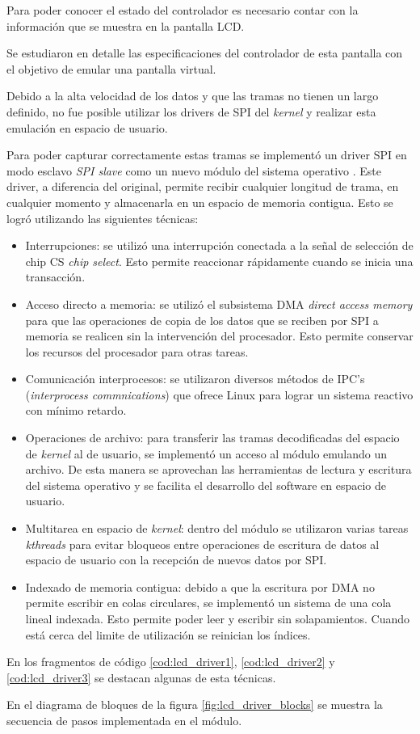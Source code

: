       Para poder conocer el estado del controlador es necesario contar con la información que se muestra en la pantalla LCD.\par
      Se estudiaron en detalle las especificaciones del controlador de esta pantalla con el objetivo de emular una pantalla virtual.\par
      Debido a la alta velocidad de los datos y que las tramas no tienen un largo definido, no fue posible utilizar los drivers de SPI del \textit{kernel} y realizar esta emulación en espacio de usuario.\par
      Para poder capturar correctamente estas tramas se implementó un driver SPI en modo esclavo \textit{SPI slave} como un nuevo módulo del sistema operativo \citep{ldd3}.
      Este driver, a diferencia del original, permite recibir cualquier longitud de trama, en cualquier momento y almacenarla en un espacio de memoria contigua.
      Esto se logró utilizando las siguientes técnicas:
      \begin{itemize}
         \item {Interrupciones: se utilizó una interrupción conectada a la señal de selección de chip CS \textit{chip select}. Esto permite reaccionar rápidamente cuando se inicia una transacción.}
         \item {Acceso directo a memoria: se utilizó el subsistema DMA \textit{direct access memory} para que las operaciones de copia de los datos que se reciben por SPI a memoria se realicen sin la intervención del procesador. Esto permite conservar los recursos del procesador para otras tareas.}
         \item{Comunicación interprocesos: se utilizaron diversos métodos de IPC's\citep{WEBSITE:kerneldocs} (\textit{interprocess commnications}) que ofrece Linux para lograr un sistema reactivo con mínimo retardo.}
         \item{Operaciones de archivo: para transferir las tramas decodificadas del espacio de \textit{kernel} al de usuario, se implementó un acceso al módulo emulando un archivo. De esta manera se aprovechan las herramientas de lectura y escritura del sistema operativo y se facilita el desarrollo del software en espacio de usuario.}
         \item{Multitarea en espacio de \textit{kernel}: dentro del módulo se utilizaron varias tareas \textit{kthreads} para evitar bloqueos entre operaciones de escritura de datos al espacio de usuario con la recepción de nuevos datos por SPI.}
         \item{Indexado de memoria contigua: debido a que la escritura por DMA no permite escribir en colas circulares, se implementó un sistema de una cola lineal indexada. Esto permite poder leer y escribir sin solapamientos. Cuando está cerca del limite de utilización se reinician los índices.}
      \end{itemize}
      En los fragmentos de código \ref{cod:lcd_driver1}, \ref{cod:lcd_driver2} y \ref{cod:lcd_driver3} se destacan algunas de esta técnicas.\par
      En el diagrama de bloques de la figura \ref{fig:lcd_driver_blocks} se muestra la secuencia de pasos implementada en el módulo.
      
